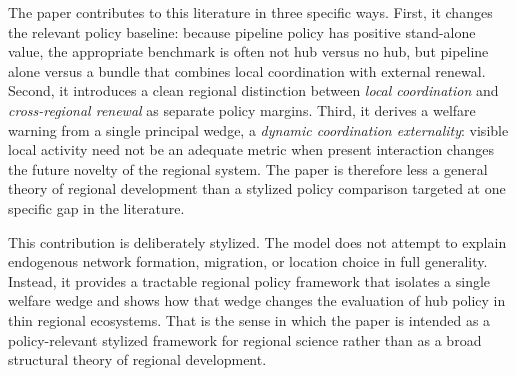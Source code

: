 The paper contributes to this literature in three specific ways. First, it changes the relevant policy baseline: because pipeline policy has positive stand-alone value, the appropriate benchmark is often not hub versus no hub, but pipeline alone versus a bundle that combines local coordination with external renewal. Second, it introduces a clean regional distinction between \emph{local coordination} and \emph{cross-regional renewal} as separate policy margins. Third, it derives a welfare warning from a single principal wedge, a \emph{dynamic coordination externality}: visible local activity need not be an adequate metric when present interaction changes the future novelty of the regional system. The paper is therefore less a general theory of regional development than a stylized policy comparison targeted at one specific gap in the literature.

This contribution is deliberately stylized. The model does not attempt to explain endogenous network formation, migration, or location choice in full generality. Instead, it provides a tractable regional policy framework that isolates a single welfare wedge and shows how that wedge changes the evaluation of hub policy in thin regional ecosystems. That is the sense in which the paper is intended as a policy-relevant stylized framework for regional science rather than as a broad structural theory of regional development.
